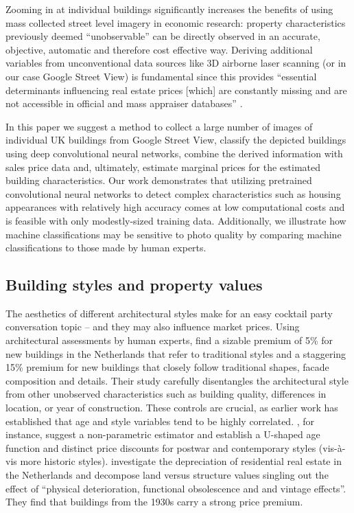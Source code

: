 \documentclass[]{article}
\begin{document}
Zooming in at individual buildings significantly increases the benefits
of using mass collected street level imagery in economic research:
property characteristics previously deemed ``unobservable'' can be
directly observed in an accurate, objective, automatic and therefore
cost effective way. Deriving additional variables from unconventional
data sources like 3D airborne laser scanning (or in our case Google
Street View) is fundamental since this provides ``essential determinants
influencing real estate prices {[}which{]} are constantly missing and
are not accessible in official and mass appraiser databases''
\autocite{Helbich2013}.

In this paper we suggest a method to collect a large number of images of
individual UK buildings from Google Street View, classify the depicted
buildings using deep convolutional neural networks, combine the derived
information with sales price data and, ultimately, estimate marginal
prices for the estimated building characteristics. Our work demonstrates
that utilizing pretrained convolutional neural networks to detect
complex characteristics such as housing appearances with relatively high
accuracy comes at low computational costs and is feasible with only
modestly-sized training data. Additionally, we illustrate how machine
classifications may be sensitive to photo quality by comparing machine
classifications to those made by human experts.

\hypertarget{building-styles-and-property-values}{%
\subsection{Building styles and property
values}\label{building-styles-and-property-values}}

The aesthetics of different architectural styles make for an easy
cocktail party conversation topic -- and they may also influence market
prices. Using architectural assessments by human experts,
\textcite{Buitelaar2017} find a sizable premium of 5\% for new buildings
in the Netherlands that refer to traditional styles and a staggering
15\% premium for new buildings that closely follow traditional shapes,
facade composition and details. Their study carefully disentangles the
architectural style from other unobserved characteristics such as
building quality, differences in location, or year of construction.
These controls are crucial, as earlier work has established that age and
style variables tend to be highly correlated. \textcite{Coulson2008},
for instance, suggest a non-parametric estimator and establish a
U-shaped age function and distinct price discounts for postwar and
contemporary styles (vis-à-vis more historic styles).
\textcite{Francke2017a} investigate the depreciation of residential real
estate in the Netherlands and decompose land versus structure values
singling out the effect of ``physical deterioration, functional
obsolescence and and vintage effects''. They find that buildings from
the 1930s carry a strong price premium.
\end{document}
